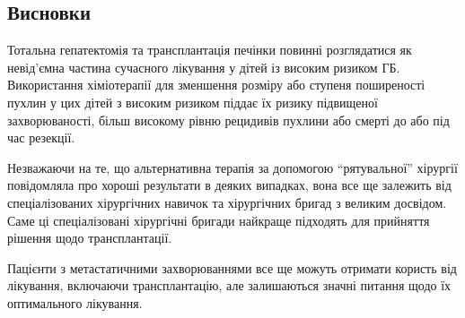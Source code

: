 \subsection{Висновки}

Тотальна гепатектомія та трансплантація печінки повинні розглядатися як невід’ємна частина сучасного лікування у дітей із високим ризиком ГБ. Використання хіміотерапії для зменшення розміру або ступеня поширеності пухлин у цих дітей з високим ризиком піддає їх ризику підвищеної захворюваності, більш високому рівню рецидивів пухлини або смерті до або під час резекції. 

Незважаючи на те, що альтернативна терапія за допомогою “рятувальної” хірургії повідомляла про хороші результати в деяких випадках, вона все ще залежить від спеціалізованих хірургічних навичок та хірургічних бригад з великим досвідом. Саме ці спеціалізовані хірургічні бригади найкраще підходять для прийняття рішення щодо трансплантації. 

Пацієнти з метастатичними захворюваннями все ще можуть отримати користь від лікування, включаючи трансплантацію, але залишаються значні питання щодо їх оптимального лікування. 
